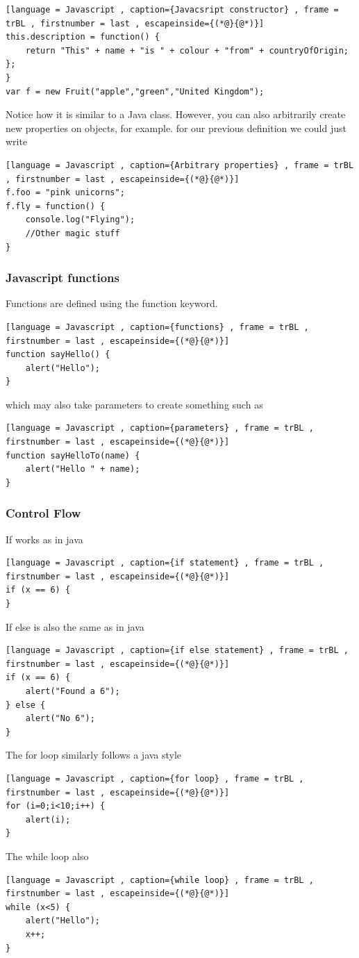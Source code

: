 \documentclass[a4paper]{article}
\theoremstyle{plain}
\theoremstyle{definition}
\theoremstyle{remark}
\begin{document}
\begin{flushleft}
\begin{lstlisting}[language = Javascript , caption={Javacsript constructor} , frame = trBL , firstnumber = last , escapeinside={(*@}{@*)}]
this.description = function() {
	return "This" + name + "is " + colour + "from" + countryOfOrigin;
};
}
var f = new Fruit("apple","green","United Kingdom");
\end{lstlisting}
Notice how it is similar to a Java class. However, you can also arbitrarily create new properties on objects, for example. for our previous definition we could just write
\begin{lstlisting}[language = Javascript , caption={Arbitrary properties} , frame = trBL , firstnumber = last , escapeinside={(*@}{@*)}]
f.foo = "pink unicorns";
f.fly = function() {
	console.log("Flying");
	//Other magic stuff
}
\end{lstlisting}
\subsubsection{Javascript functions}
Functions are defined using the function keyword.
\begin{lstlisting}[language = Javascript , caption={functions} , frame = trBL , firstnumber = last , escapeinside={(*@}{@*)}]
function sayHello() {
	alert("Hello");
}
\end{lstlisting}
which may also take parameters to create something such as
\begin{lstlisting}[language = Javascript , caption={parameters} , frame = trBL , firstnumber = last , escapeinside={(*@}{@*)}]
function sayHelloTo(name) {
	alert("Hello " + name);
}
\end{lstlisting}
\subsubsection{Control Flow}
If works as in java
\begin{lstlisting}[language = Javascript , caption={if statement} , frame = trBL , firstnumber = last , escapeinside={(*@}{@*)}]
if (x == 6) {
}
\end{lstlisting}
If else is also the same as in java
\begin{lstlisting}[language = Javascript , caption={if else statement} , frame = trBL , firstnumber = last , escapeinside={(*@}{@*)}]
if (x == 6) {
	alert("Found a 6");
} else {
	alert("No 6");
}
\end{lstlisting}
The for loop similarly follows a java style
\begin{lstlisting}[language = Javascript , caption={for loop} , frame = trBL , firstnumber = last , escapeinside={(*@}{@*)}]
for (i=0;i<10;i++) {
	alert(i);
}
\end{lstlisting}
The while loop also
\begin{lstlisting}[language = Javascript , caption={while loop} , frame = trBL , firstnumber = last , escapeinside={(*@}{@*)}]
while (x<5) {
	alert("Hello");
	x++;
}
\end{lstlisting}

\end{flushleft}
\end{document}
